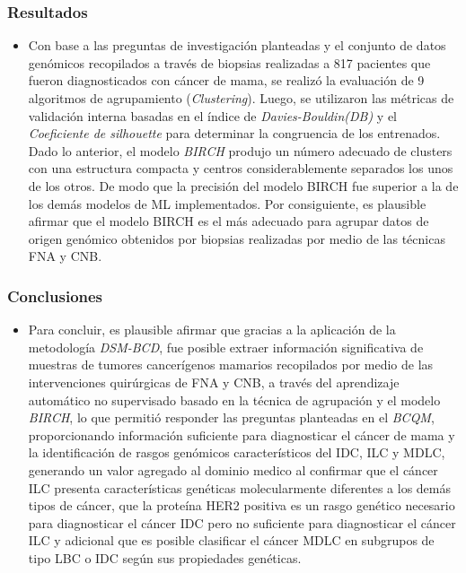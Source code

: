 \documentclass[xcolor=dvipsnames,xcolor=table,10pt]{beamer} %
\begin{document}
\begin{frame}
	\frametitle{Resultados}
	\begin{itemize}\justifying
		\item Con base a las preguntas de investigación planteadas y el conjunto de datos genómicos recopilados a través de biopsias realizadas a 817 pacientes que fueron diagnosticados con cáncer de mama, se realizó la evaluación de 9 algoritmos de agrupamiento (\textit{Clustering}). Luego, se utilizaron las métricas de validación interna basadas en el índice de \textit{Davies-Bouldin(DB)} y el \textit{Coeficiente de silhouette} para determinar la congruencia de los  entrenados. Dado lo anterior, el modelo \textit{BIRCH} produjo un número adecuado de clusters con una estructura compacta y centros considerablemente separados los unos de los otros. De modo que la precisión del modelo BIRCH fue superior a la de los demás modelos de ML implementados. Por consiguiente, es plausible afirmar que el modelo BIRCH es el más adecuado para agrupar datos de origen genómico obtenidos por biopsias realizadas por medio de las técnicas FNA y CNB.
	\end{itemize}
\end{frame}
\begin{frame}
	\frametitle{Conclusiones}
	\begin{itemize}\justifying
		\item Para concluir, es plausible afirmar que gracias a la aplicación de la metodología \textit{DSM-BCD}, fue posible extraer información significativa de muestras de tumores cancerígenos mamarios recopilados por medio de las intervenciones quirúrgicas de FNA y CNB, a través del aprendizaje automático no supervisado basado en la técnica de agrupación y el modelo \textit{BIRCH}, lo que permitió responder las preguntas planteadas en el \textit{BCQM}, proporcionando información suficiente para diagnosticar el cáncer de mama y la identificación de  rasgos genómicos característicos del IDC, ILC y MDLC, generando un valor agregado al dominio medico al confirmar que el cáncer ILC presenta características genéticas molecularmente diferentes a los demás tipos de cáncer, que  la proteína HER2 positiva es un rasgo genético necesario para diagnosticar el cáncer IDC pero no suficiente para diagnosticar el cáncer ILC y adicional que es posible clasificar el cáncer MDLC en subgrupos de tipo LBC o IDC según sus propiedades genéticas.
	\end{itemize}
\end{frame}
\end{document}
